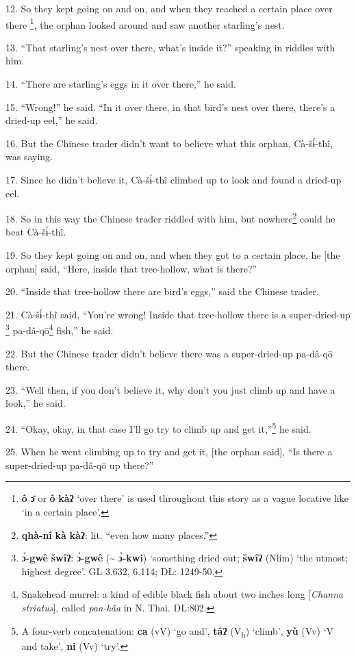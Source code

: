 12. So they kept going on and on, and when they reached a certain place over there
\footnote{\textbf{ô} \textbf{ɔ̄} or \textbf{ô} \textbf{kàʔ} `over there' is used throughout this story as a vague locative like `in a certain place'.}, the orphan looked around and saw another starling's nest.

13. ``That starling's nest over there, what's inside it?'' speaking in riddles
with him.

14. ``There are starling's eggs in it over there,'' he said.

15. ``Wrong!'' he said. ``In it over there, in that bird's nest over there, there's
a dried-up eel,'' he said.

16. But the Chinese trader didn't want to believe what this orphan, Cà-šɨ́-thî,
was saying.

17. Since he didn't believe it, Cà-šɨ́-thî climbed up to look and found a
dried-up eel.

18. So in this way the Chinese trader riddled with him, but nowhere\footnote{\textbf{qhà-nî} \textbf{kà} \textbf{kàʔ}: lit. ``even how many places.''} could he
beat Cà-šɨ́-thî.

19. So they kept going on and on, and when they got to a certain place, he [the
orphan] said, ``Here, inside that tree-hollow, what is there?''

20. ``Inside that tree-hollow there are bird's eggs,'' said the Chinese trader.

21. Cà-šɨ́-thî said, ``You're wrong! Inside that tree-hollow there is a super-dried-up
\footnote{\textbf{ɔ̀-gwê} \textbf{šwîʔ}: \textbf{ɔ̀-gwê} (\textasciitilde{} \textbf{ɔ̀-kwi}) `something dried out; \textbf{šwîʔ} (Nlim) `the utmost; highest degree'. GL 3.632, 6.114; DL: 1249-50.} pa-dâ-qō\footnote{Snakehead murrel: a kind of edible black fish about two inches long [\textit{Channa striatus}], called \textit{paa-kâa} in N. Thai. DL:802.} fish,'' he said.

22. But the Chinese trader didn't believe there was a super-dried-up pa-dâ-qō
there.

23. ``Well then, if you don't believe it, why don't you just climb up and have
a look,'' he said.

24. ``Okay, okay, in that case I'll go try to climb up and get it,''\footnote{A four-verb concatenation: \textbf{ca} (vV) `go and', \textbf{tâʔ} (V\textsubscript{h}) `climb', \textbf{yù} (Vv) `V and take', \textbf{ni} (Vv) `try'.} he said.

25. When he went climbing up to try and get it, [the orphan said], ``Is there a
super-dried-up pa-dâ-qō up there?''

